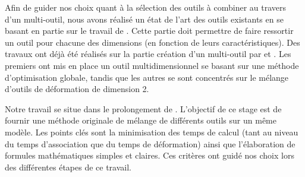 Afin de guider nos choix quant à la sélection des outils à combiner au travers
d'un multi-outil, nous avons réalisé un état de l'art des outils existants en
se basant en partie sur le travail de \cite{GB08}. Cette partie doit permettre
de faire ressortir un outil pour chacune des dimensions (en fonction de leurs
caractéristiques). Des travaux ont déjà été réalisés sur la partie création
d'un multi-outil par \cite{JBPS11} et \cite{GPCP13}. Les premiers ont mis en
place un outil multidimensionnel se basant sur une méthode d'optimisation
globale, tandis que les autres se sont concentrés sur le mélange d'outils de
déformation de dimension 2. 

Notre travail se situe dans le prolongement de \cite{GPCP13}. L'objectif de ce
stage est de fournir une méthode originale de mélange de différents outils sur
un même modèle. Les points clés sont la minimisation des temps de calcul
(tant au niveau du temps d'association que du temps de déformation) ainsi que
l'élaboration de formules mathématiques simples et claires. Ces critères ont
guidé nos choix lors des différentes étapes de ce travail.
